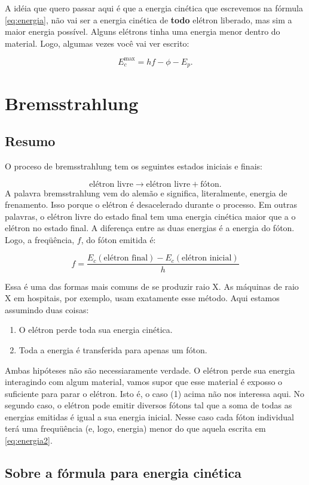 \documentclass{article}
\begin{document}
A id\'eia que quero passar aqui \'e que a energia cin\'etica que escrevemos na f\'ormula \eqref{eq:energia}, n\~ao vai ser a energia cin\'etica de \textbf{todo} el\'etron liberado, mas sim a maior energia poss\'ivel. Alguns el\'etrons tinha uma energia menor dentro do material. Logo, algumas vezes voc\^e vai ver escrito:

\begin{equation}
E_c^{\text{max}} = hf - \phi - E_p.
\end{equation}

\section{Bremsstrahlung}

\subsection{Resumo}
O proceso de bremsstrahlung tem os seguintes estados iniciais e finais:

\begin{equation}
\text{el\'etron livre} \rightarrow \text{el\'etron livre} + \text{f\'oton}.
\end{equation}
A palavra bremsstrahlung vem do alem\~ao e significa, literalmente, energia de frenamento. Isso porque o el\'etron \'e desacelerado durante o processo. Em outras palavras, o el\'etron livre do estado final tem uma energia cin\'etica maior que a o el\'etron no estado final. A diferen\c ca entre as duas energias \'e a energia do f\'oton. Logo, a freq\"u\^encia, $f$, do f\'oton emitida \'e:

\begin{equation}\label{eq:energia2}
f = \frac{E_c(\text{el\'etron final})-E_c(\text{el\'etron inicial})}{h}
\end{equation}

Essa \'e uma das formas mais comuns de se produzir raio X. As m\'aquinas de raio X em hospitais, por exemplo, usam exatamente esse m\'etodo. Aqui estamos assumindo duas coisas:

\begin{enumerate}
\item O el\'etron perde toda sua energia cin\'etica.
\item Toda a energia \'e transferida para apenas um f\'oton.
\end{enumerate}
Ambas hip\'oteses n\~ao s\~ao necessiaramente verdade. O el\'etron perde sua energia interagindo com algum material, vamos supor que esse material \'e exposso o suficiente para parar o el\'etron. Isto \'e, o caso (1) acima n\~ao nos interessa aqui. No segundo caso, o el\'etron pode emitir diversos f\'otons tal que a soma de todas as energias emitidas \'e igual a sua energia inicial. Nesse caso cada f\'oton individual ter\'a uma frequ\"u\^encia (e, logo, energia) menor do que aquela escrita em \eqref{eq:energia2}.

\subsection{Sobre a f\'ormula para energia cin\'etica}
\end{document}
